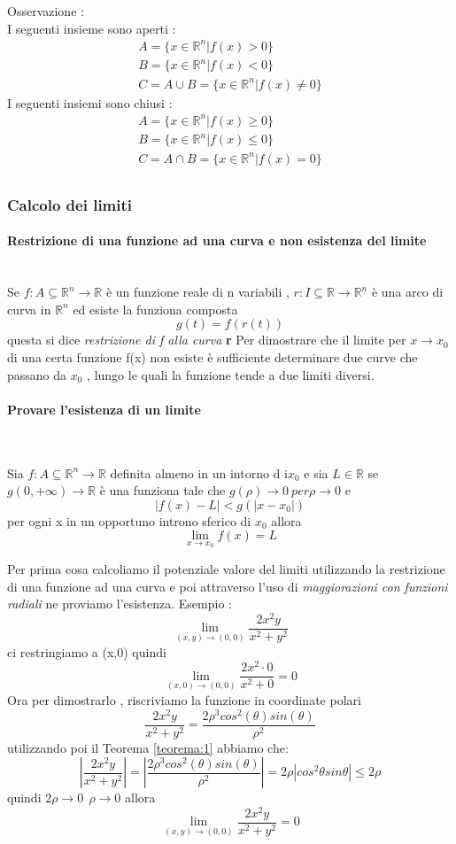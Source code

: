 \documentclass{article}
\theoremstyle{definition}
\newcommand{\R}{\mathbb{R}}
\newcommand{\Rn}{\R^n}
\newcommand{\fn}{f: A\subseteq \Rn \rightarrow \R}
\begin{document}
	Osservazione : \\
	I seguenti insieme sono aperti : 
	\begin{align*}
		A= \{x\in \Rn | f(x) > 0\}\\
		B=\{x\in \Rn | f(x) < 0\}\\
		C=A \cup B =  \{x\in \Rn | f(x) \neq 0\}
	\end{align*}
	I seguenti insiemi sono  chiusi : 
	\begin{align*}
		A=\{x\in \Rn | f(x) \geq 0\}\\
		B= \{x\in \Rn | f(x) \leq 0\}\\
		C=A\cap B=\{x\in \Rn | f(x) = 0\}\\
	\end{align*}
	\subsubsection{Calcolo dei limiti}
	\paragraph{Restrizione di una funzione ad una curva e non esistenza del limite}\hspace{1cm}\\
	Se $\fn$ è un funzione reale di n variabili , $r: I \subseteq \R \rightarrow\Rn$ è una arco di curva in $\Rn$ ed esiste la funziona composta $$g(t)=f(r(t))$$
	questa si dice \textit{restrizione di f alla curva} \textbf{r}
	Per dimostrare che il limite per $x \rightarrow x_0$ di una certa funzione f(x) non esiste è sufficiente determinare due curve che passano da $x_0$ , lungo le quali la funzione tende a due limiti diversi.
	\paragraph{Provare l'esistenza di un limite}\hspace{1cm}\\
	\begin{teo}{}{}
		\label{teorema:1}
		Sia $\fn$ definita almeno in un intorno d i$x_0$ e sia $ L \in \R$ se $g(0,+\infty) \rightarrow \R$ è una funziona tale che $g(\rho)\rightarrow 0 \ per \rho \rightarrow 0 $ e $$|f(x)-L|<g(|x-x_0|)$$   
		per ogni x in un opportuno introno sferico di $ x_0$ allora $$\lim_{x\rightarrow x_0}f(x)=L$$
	\end{teo}
	Per prima cosa calcoliamo il potenziale valore del limiti utilizzando la restrizione di una funzione ad una curva e poi attraverso l'uso di \textit{maggiorazioni con funzioni radiali} ne proviamo l'esistenza. 
	Esempio :\\
	$$\lim_{(x,y)\rightarrow(0,0) }\frac{2x^2y}{x^2+y^2} $$
	ci restringiamo a (x,0) quindi $$\lim_{(x,0) \rightarrow(0,0)}\frac{2x^2 \cdot 0}{x^2+0}=0$$
	Ora per dimostrarlo , riscriviamo la funzione in coordinate polari 
	$$\frac{2x^2y}{x^2+y^2}=\frac{2\rho^3 cos^2(\theta)sin(\theta)}{\rho^2}$$
	utilizzando poi il Teorema \ref{teorema:1} abbiamo che: 
	$$\left | \frac{2x^2y}{x^2+y^2}\right |=\left|\frac{2\rho^3 cos^2(\theta)sin(\theta)}{\rho^2}\right |= 2\rho |cos^2\theta sin\theta| \leq 2 \rho$$
	quindi $2\rho \rightarrow 0 \ \ \rho \rightarrow 0$ allora $$\lim_{(x,y)\rightarrow(0,0) }\frac{2x^2y}{x^2+y^2}=0$$
\end{document}
